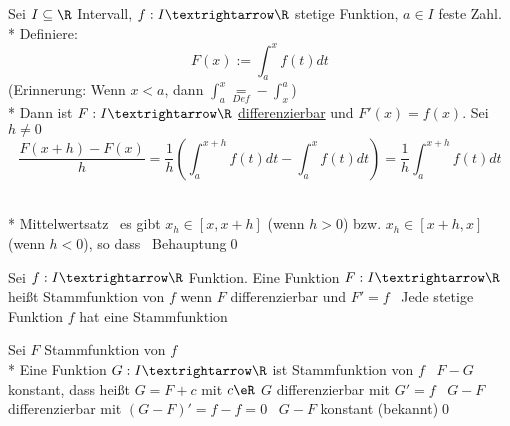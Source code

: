Sei $I\subseteq\R$ Intervall, $f:I→\R$ stetige Funktion, $a\in I$ feste Zahl.\\*
Definiere: $$F(x):=\int_a^x f(t)dt$$
(Erinnerung: Wenn $x<a$, dann $\int_a^x\underset{Def}{=}-\int_x^a$)\\*
Dann ist $F:I→\R$ \ul{differenzierbar} und $F'(x)=f(x)$.
\bew
Sei $h≠0$ $$\frac{F(x+h)-F(x)}{h}=\frac{1}{h}\left(\int_a^{x+h}f(t)dt-\int_a^xf(t)dt\right)=\frac{1}{h}\int_a^{x+h}f(t)dt$$
\\*
Mittelwertsatz \Rarr\ es gibt $x_h\in[x,x+h]$ (wenn $h>0$) bzw. $x_h\in[x+h,x]$ (wenn $h<0$), so dass
\Rarr\ Behauptung\qed

Sei $f:I→\R$ Funktion. Eine Funktion $F:I→\R$ heißt Stammfunktion von $f$ wenn $F$ differenzierbar und $F'=f$
 \Rarr\ Jede stetige Funktion $f$ hat eine Stammfunktion

Sei $F$ Stammfunktion von $f$\\*
Eine Funktion $G:I→\R$ ist Stammfunktion von $f$ \equ\ $F-G$ konstant, dass heißt $G=F+c$ mit $c\eR$
\bew
$G$ differenzierbar mit $G'=f$ \equ\ $G-F$ differenzierbar mit $(G-F)'=f-f=0$ \equ\ $G-F$ konstant (bekannt)\qed

